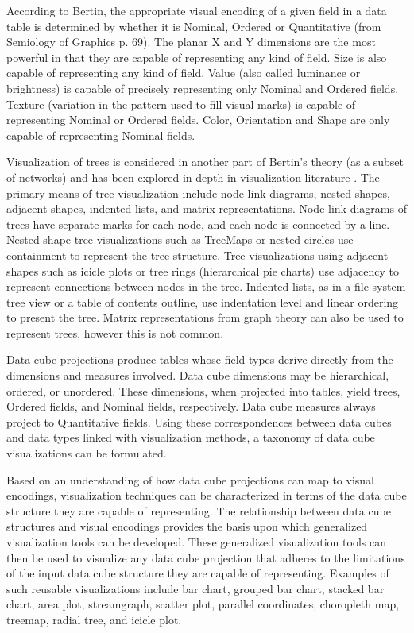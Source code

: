 \documentclass[12pt]{article}
\begin{document}
\begin{doublespace}
According to Bertin, the appropriate visual encoding of a given field in a data table is determined by whether it is Nominal, Ordered or Quantitative (from Semiology of Graphics \cite{bertin1983semiology} p. 69). The planar X and Y dimensions are the most powerful in that they are capable of representing any kind of field. Size is also capable of representing any kind of field. Value (also called luminance or brightness) is capable of precisely representing only Nominal and Ordered fields. Texture (variation in the pattern used to fill visual marks) is capable of representing Nominal or Ordered fields. Color, Orientation and Shape are only capable of representing Nominal fields.

Visualization of trees is considered in another part of Bertin's theory (as a subset of networks) and has been explored in depth in visualization literature \cite{graham2010survey} \cite{shneiderman1992tree} \cite{schulz2011treevis} \cite{barlow2001comparison}. The primary means of tree visualization include node-link diagrams, nested shapes, adjacent shapes, indented lists, and matrix representations. Node-link diagrams of trees have separate marks for each node, and each node is connected by a line. Nested shape tree visualizations such as TreeMaps or nested circles use containment to represent the tree structure. Tree visualizations using adjacent shapes such as icicle plots or tree rings (hierarchical pie charts) use adjacency to represent connections between nodes in the tree. Indented lists, as in a file system tree view or a table of contents outline, use indentation level and linear ordering to present the tree. Matrix representations from graph theory can also be used to represent trees, however this is not common.

Data cube projections produce tables whose field types derive directly from the dimensions and measures involved. Data cube dimensions may be hierarchical, ordered, or unordered. These dimensions, when projected into tables, yield trees, Ordered fields, and Nominal fields, respectively. Data cube measures always project to Quantitative fields. Using these correspondences between data cubes and data types linked with visualization methods, a taxonomy of data cube visualizations can be formulated.

Based on an understanding of how data cube projections can map to visual encodings, visualization techniques can be characterized in terms of the data cube structure they are capable of representing. The relationship between data cube structures and visual encodings provides the basis upon which generalized visualization tools can be developed. These generalized visualization tools can then be used to visualize any data cube projection that adheres to the limitations of the input data cube structure they are capable of representing. Examples of such reusable visualizations include bar chart, grouped bar chart, stacked bar chart, area plot, streamgraph, scatter plot, parallel coordinates, choropleth map, treemap, radial tree, and icicle plot.


\end{doublespace}
\end{document}
